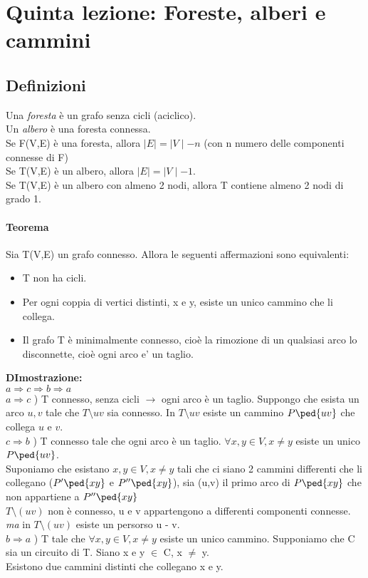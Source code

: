 \section{Quinta lezione: Foreste, alberi e cammini}
\subsection{Definizioni}
Una \emph{foresta} è un grafo senza cicli (aciclico). \\
Un \emph{albero} è una foresta connessa. \\

\noindent
Se F(V,E) è una foresta, allora $\mid E\mid = \mid V\mid-  n$ (con n numero delle componenti connesse di F) \\
Se T(V,E) è un albero, allora $\mid E\mid = \mid V\mid -1$. \\

\noindent
Se T(V,E) è un albero con almeno 2 nodi, allora T contiene almeno 2 nodi di grado 1. \\
\paragraph{Teorema} Sia T(V,E) un grafo connesso. Allora le seguenti affermazioni sono equivalenti:
\begin{itemize}
\item T non ha cicli.
\item Per ogni coppia di vertici distinti, x e y, esiste un unico cammino che li collega.
\item Il grafo T è minimalmente connesso, cioè la rimozione di un qualsiasi arco lo disconnette,
cioè ogni arco e' un taglio.
\end{itemize}
\textbf{DImostrazione:} \\
\(a \Rightarrow c \Rightarrow b \Rightarrow a \) \\

\noindent
\(a \Rightarrow c\) ) T connesso, senza cicli $\rightarrow$ ogni arco è un taglio. Suppongo che esista un arco $u,v$ tale che $T \setminus uv$ sia connesso. In $T \setminus uv$ esiste un cammino $P\ped{uv}$ che collega $u$ e $v$.\\
$c \Rightarrow b$ ) T connesso tale che ogni arco è un taglio. \(\forall x, y \in V , x \neq y\) esiste un unico $P\ped{uv}$. \\
Suponiamo che esistano $x, y \in V, x \neq y$ tali che ci siano 2 cammini differenti che li collegano ($P' \ped{xy}$ e $P''\ped{xy}$), sia (u,v) il primo arco di $P\ped{xy}$ che non appartiene a $P''\ped{xy}$ \\
$T \setminus (uv)$ non è connesso, u e v appartengono a differenti componenti connesse. \emph{ma} in $T \setminus (uv)$ esiste un persorso u - v. \\
$b \Rightarrow a$ ) T tale che \(\forall x,y \in V, x \neq y\) esiste un unico cammino.
Supponiamo che C sia un circuito di T. Siano x e y $\in$ C, x $\neq$ y. \\
Esistono due cammini distinti che collegano x e y.
\\

